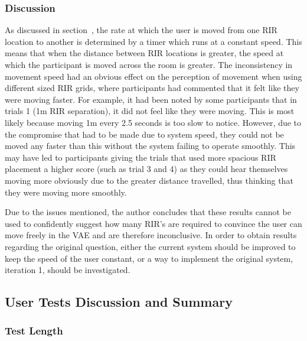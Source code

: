\documentclass[../../main.tex]{subfiles}
\begin{document}
			\subsubsection{Discussion}

			As discussed in section~, the rate at which the user is moved from one \ac{RIR} location to another is determined by a timer which runs at a constant speed. This means that when the distance between \ac{RIR} locations is greater, the speed at which the participant is moved across the room is greater. The inconsistency in movement speed had an obvious effect on the perception of movement when using different sized \ac{RIR} grids, where participants had commented that it felt like they were moving faster. For example, it had been noted by some participants that in trials 1 (1m \ac{RIR} separation), it did not feel like they were moving. This is most likely because moving 1m every 2.5 seconds is too slow to notice. However, due to the compromise that had to be made due to system speed, they could not be moved any faster than this without the system failing to operate smoothly. This may have led to participants giving the trials that used more spacious \ac{RIR} placement a higher score (such as trial 3 and 4) as they could hear themselves moving more obviously due to the greater distance travelled, thus thinking that they were moving more smoothly.

			Due to the issues mentioned, the author concludes that these results cannot be used to confidently suggest how many \ac{RIR}'s are required to convince the user can move freely in the \ac{VAE} and are therefore inconclusive. In order to obtain results regarding the original question, either the current system should be improved to keep the speed of the user constant, or a way to implement the original system, iteration 1, should be investigated.

		\subsection{User Tests Discussion and Summary}

			\subsubsection{Test Length}
\end{document}
